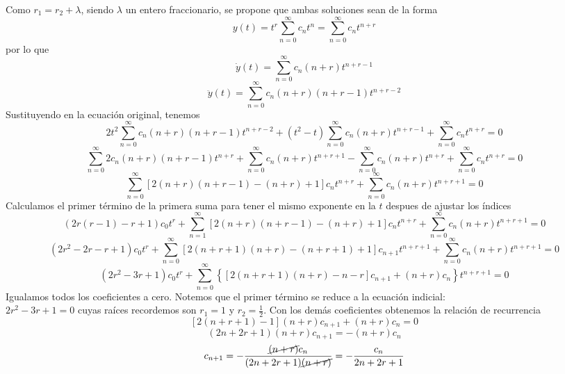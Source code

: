 \documentclass{article}
\begin{document}
\begin{enumerate}
{            Como $r_1=r_2+\lambda$, siendo $\lambda$ un entero fraccionario, se propone que ambas soluciones sean de la forma
            $$y(t)=t^r\sum_{n=0}^{\infty}{c_nt^n}=\sum_{n=0}^{\infty}{c_nt^{n+r}}$$
            por lo que
            $$\dot y(t)=\sum_{n=0}^{\infty}{c_n(n+r)t^{n+r-1}}$$
            $$\ddot y(t)=\sum_{n=0}^{\infty}{c_n(n+r)(n+r-1)t^{n+r-2}}$$
            Sustituyendo en la ecuación original, tenemos
            \[
                2t^2\sum_{n=0}^{\infty}{c_n(n+r)(n+r-1)t^{n+r-2}}
                +(t^2-t)\sum_{n=0}^{\infty}{c_n(n+r)t^{n+r-1}}
                +\sum_{n=0}^{\infty}{c_nt^{n+r}} = 0
            \]
            \[
                \sum_{n=0}^{\infty}{2c_n(n+r)(n+r-1)t^{n+r}}
                +\sum_{n=0}^{\infty}{c_n(n+r)t^{n+r+1}}
                -\sum_{n=0}^{\infty}{c_n(n+r)t^{n+r}}
                +\sum_{n=0}^{\infty}{c_nt^{n+r}}=0
            \]
            \[
                \sum_{n=0}^{\infty}{[2(n+r)(n+r-1)-(n+r)+1]c_nt^{n+r}}
                +\sum_{n=0}^{\infty}{c_n(n+r)t^{n+r+1}}=0
            \]
            Calculamos el primer término de la primera suma para tener el mismo exponente en la $t$ despues de ajustar los índices
            \[
                \left(2r(r-1)-r+1\right)c_0t^r
                +\sum_{n=1}^{\infty}{[2(n+r)(n+r-1)-(n+r)+1]c_nt^{n+r}}
                +\sum_{n=0}^{\infty}{c_n(n+r)t^{n+r+1}}=0
            \]
            \[
                \left(2r^2-2r-r+1\right)c_0t^r
                +\sum_{n=0}^{\infty}{[2(n+r+1)(n+r)-(n+r+1)+1]c_{n+1}t^{n+r+1}}
                +\sum_{n=0}^{\infty}{c_n(n+r)t^{n+r+1}}=0
            \]
            \[
                \left(2r^2-3r+1\right)c_0t^r
                +\sum_{n=0}^{\infty}{
                    \left\{
                        \left[
                            2(n+r+1)(n+r)-n-r
                        \right]c_{n+1}
                        +
                        (n+r)c_n
                    \right\}
                    t^{n+r+1}
                }=0
            \]
            Igualamos todos los coeficientes a cero. Notemos que el primer término se reduce a la ecuación indicial:\\
            $2r^2-3r+1=0$ cuyas raíces recordemos son $r_1=1$ y $r_2=\frac{1}{2}$. Con los demás coeficientes obtenemos la relación de recurrencia
            \[
                [2(n+r+1)-1](n+r)c_{n+1}+(n+r)c_n=0
            \]
            \[
                (2n+2r+1)(n+r)c_{n+1}=-(n+r)c_n
            \]
            \[
                c_{n+1}=-\frac{\cancel{(n+r)}c_n}{(2n+2r+1)\cancel{(n+r)}}
                =-\frac{c_n}{2n+2r+1}
            \]
}
\end{enumerate}
\end{document}
